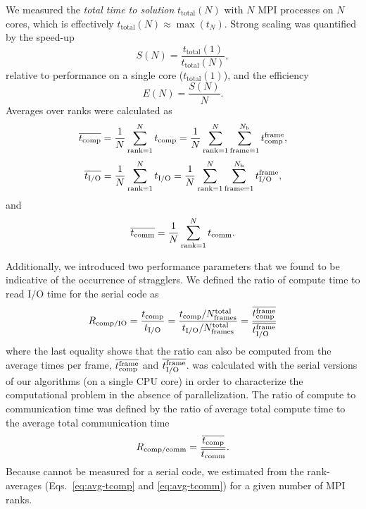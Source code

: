 We measured the \emph{total time to solution} $t_{\text{total}}(N)$ with $N$ MPI processes on $N$ cores, which is effectively
$t_{\text{total}}(N) \approx \max(t_{N})$. 
Strong scaling was quantified by the speed-up
\begin{equation}
  \label{eq:speedup}
  S(N) = \frac{t_{\text{total}}(1)}{t_{\text{total}}(N)},
\end{equation}
relative to performance on a single core ($t_{\text{total}}(1)$), and the efficiency
\begin{equation}
  \label{eq:efficiency}
  E(N) = \frac{S(N)}{N}.
\end{equation}
Averages over ranks were calculated as
\begin{equation}
  \label{eq:avg-tcomp}
  \overline{{t}_{\text{comp}}} = \frac{1}{N}
  \sum_{\text{rank}=1}^{N}{t}_{\text{comp}} = \frac{1}{N}\sum_{\text{rank}=1}^{N}\sum_{\text{frame}=1}^{N_\text{b}}{t}_{\text{comp}}^{\text{frame}},
\end{equation}
\begin{equation}
  \label{eq:avg-tIO}
  \overline{{t}_{\text{I/O}}} = \frac{1}{N}\sum_{\text{rank}=1}^{N}{t}_{\text{I/O}} = \frac{1}{N}\sum_{\text{rank}=1}^{N}\sum_{\text{frame}=1}^{N_{\text{b}}}{t}_{\text{I/O}}^{\text{frame}},
\end{equation}
and
\begin{equation}
  \label{eq:avg-tcomm}
  \overline{t_{\text{comm}}} = \frac{1}{N}\sum_{\text{rank}=1}^{N}t_{\text{comm}}.
\end{equation}

Additionally, we introduced two performance parameters that we found to be indicative of the occurrence of stragglers.
We defined the ratio of compute time to read I/O time for the serial code as
\begin{equation}
  \RcompIO = \frac{\tcomp}{\tIO} = %
  \frac{\tcomp/N_{\text{frames}}^{\text{total}}}{\tIO/N_{\text{frames}}^{\text{total}}}  = %
  \frac{\overline{\tcomp^{\text{frame}}}}{\overline{\tIO^{\text{frame}}}}  
  \label{eq:Compute-IO}
\end{equation}
where the last equality shows that the ratio can also be computed from the average times per frame, $\overline{{t}_{\text{comp}}^{\text{frame}}}$ and $\overline{{t}_{\text{I/O}}^{\text{frame}}}$.
\RcompIO was calculated with the serial versions of our algorithms (on a single CPU core) in order to characterize the computational problem in the absence of parallelization.
The ratio of compute to communication time was defined by the ratio of average total compute time to the average total communication time   
\begin{equation}
  \label{eq:Compute-comm}
  R_{\text{comp/comm}} = \frac{\overline{{t}_{\text{comp}}}}{\overline{t_{\text{comm}}}}.
\end{equation}
Because \tcomm cannot be measured for a serial code, we estimated \Rcompcomm from the rank-averages (Eqs.~\ref{eq:avg-tcomp} and \ref{eq:avg-tcomm}) for a given number of MPI ranks.
